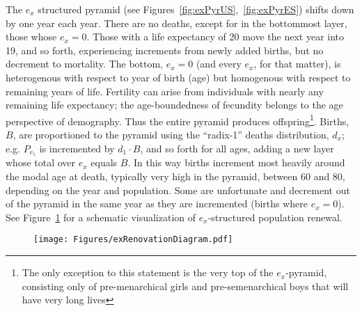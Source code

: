  \FloatBarrier
\label{sec:exrenewal}
The $e_x$ structured pyramid (see Figures~\ref{fig:exPyrUS},~\ref{fig:exPyrES})
shifts down by one year each year. There are no deaths, except for in 
the bottommost layer, those whose $e_x = 0$. Those with a life
expectancy of 20 move the next year into 19, and so forth, experiencing
increments from newly added births, but no decrement to mortality. The bottom,
$e_x = 0$ (and every $e_x$, for that matter), is heterogenous with 
respect to year of birth (age) but homogenous with respect to remaining 
years of life. Fertility can arise from individuals with nearly any remaining life
expectancy; the age-boundedness of fecundity belongs to the age
perspective of demography. Thus the entire pyramid produces offspring\footnote{The only exception
to this statement is the very top of the $e_x$-pyramid, consisting only of
pre-menarchical girls and pre-semenarchical boys that will have very long
lives}. Births, $B$, are proportioned to the pyramid using the ``radix-1''
deaths distribution, $d_x$; e.g. $P_{e_1}$ is incremented by $d_1 \cdot B$, and
so forth for all ages, adding a new layer whose total over $e_x$ equals $B$. In this way births
increment most heavily around the modal age at death, typically very high in the
pyramid, between 60 and 80, depending on the year and population. Some are
unfortunate and decrement out of the pyramid in the same year as they are
incremented (births where $e_x = 0$). See Figure~\ref{fig:exrenewal} for a
schematic visualization of $e_x$-structured population renewal.

\begin{figure}[ht!]
        \centering  
          \caption{}
           \texttt{[image: Figures/exRenovationDiagram.pdf]}
          \label{fig:exrenewal}
\end{figure}


